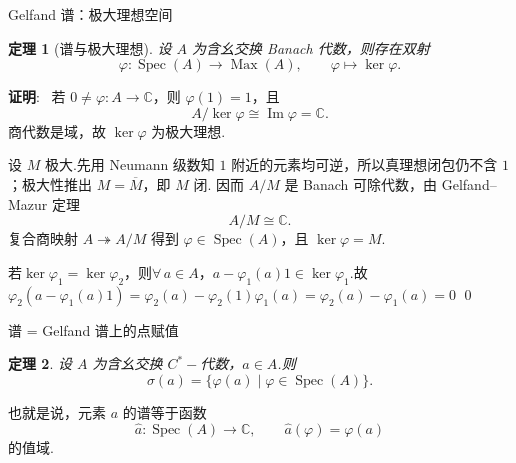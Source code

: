 \documentclass[notheorems,11pt]{beamer}
\theoremstyle{plain}
\newtheorem{theorem}{定理}
\numberwithin{theorem}{section}
\numberwithin{lemma}{section}
\numberwithin{corollary}{section}
\theoremstyle{example}
\renewenvironment{proof}[1][证明]{\textbf{#1}:~}{\qed\par}
\DeclareMathOperator{\Spec}{Spec}
\begin{document}
\begin{frame}{Gelfand 谱：极大理想空间}
  \begin{theorem}[谱与极大理想]
    设 $A$ 为含幺交换 Banach 代数，则存在双射
    \[
      \varphi:\Spec(A)\longrightarrow \operatorname{Max}(A),\qquad
      \varphi\longmapsto \ker\varphi.
    \]
  \end{theorem}
  \pause
  \begin{proof}\footnotesize
     若 $0\neq\varphi:A\to\mathbb C$，则 $\varphi(1)=1$，且
    \[
      A/\ker\varphi\cong \operatorname{Im}\varphi=\mathbb C.
    \]
    商代数是域，故 $\ker\varphi$ 为极大理想.\par
     设 $M$ 极大.先用 Neumann 级数知 $1$ 附近的元素均可逆，所以真理想闭包仍不含 $1$；极大性推出 $M=\overline M$，即 $M$ 闭.
    因而 $A/M$ 是 Banach 可除代数，由 Gelfand--Mazur 定理
    \[
      A/M\cong\mathbb C.
    \]
    复合商映射 $A\twoheadrightarrow A/M$ 得到 $\varphi\in\Spec(A)$，且 $\ker\varphi=M$.\par
     若$\ker\varphi_1=\ker\varphi_2$，则$\forall\, a\in A$，$a-\varphi_1(a)1\in\ker\varphi_1$.故$\varphi_2(a-\varphi_1(a)1)=\varphi_2(a)-\varphi_2(1)\varphi_1(a)=\varphi_2(a)-\varphi_1(a)=0$
  \end{proof}
\end{frame}



\begin{frame}{谱 = Gelfand 谱上的点赋值}
  \begin{theorem}
    设 $A$ 为含幺交换 $C^*-\!$代数，$a \in A$.则
    \begin{equation*}
      \boxed{\sigma(a) = \{\varphi(a) \mid \varphi \in \Spec(A)\}}.
    \end{equation*}
  \end{theorem}
  \pause
  也就是说，元素 $a$ 的谱等于函数
  \[
    \widehat a:\Spec(A)\to\mathbb C,\qquad
    \widehat a(\varphi)=\varphi(a)
  \]
  的值域.
\end{frame}
\end{document}
